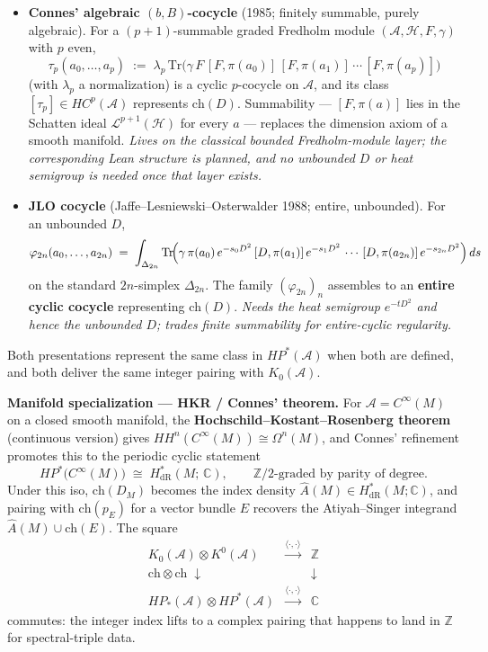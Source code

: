 \documentclass[
  11pt,
]{article}
\providecommand{\tightlist}{%
  \setlength{\itemsep}{0pt}\setlength{\parskip}{0pt}}
\begin{document}
\begin{itemize}
\tightlist
\item
  \textbf{Connes' algebraic \((b, B)\)-cocycle} (1985; finitely
  summable, purely algebraic). For a \((p+1)\)-summable graded Fredholm
  module \((\mathcal{A}, \mathcal{H}, F, \gamma)\) with \(p\) even, \[
  \tau_p(a_0, \dots, a_p)
  \;:=\; \lambda_p\,\mathrm{Tr}\bigl(\gamma\,F\,[F, \pi(a_0)]\,[F, \pi(a_1)]\,\cdots\,[F, \pi(a_p)]\bigr)
  \] (with \(\lambda_p\) a normalization) is a cyclic \(p\)-cocycle on
  \(\mathcal{A}\), and its class \([\tau_p] \in HC^p(\mathcal{A})\)
  represents \(\mathrm{ch}(D)\). Summability --- \([F, \pi(a)]\) lies in
  the Schatten ideal \(\mathcal{L}^{p+1}(\mathcal{H})\) for every \(a\)
  --- replaces the dimension axiom of a smooth manifold. \emph{Lives
  on the classical bounded Fredholm-module layer; the corresponding
  Lean structure is planned, and no unbounded \(D\) or heat semigroup
  is needed once that layer exists.}
\item
  \textbf{JLO cocycle} (Jaffe--Lesniewski--Osterwalder 1988; entire,
  unbounded). For an unbounded \(D\), \[
  \varphi_{2n}(a_0, \dots, a_{2n}) \;=\;
  \int_{\Delta_{2n}} \mathrm{Tr}\!\Bigl(\gamma\,\pi(a_0)\,e^{-s_0 D^2}\,[D, \pi(a_1)]\,e^{-s_1 D^2}\,\cdots\,[D, \pi(a_{2n})]\,e^{-s_{2n} D^2}\Bigr)\,ds
  \] on the standard \(2n\)-simplex \(\Delta_{2n}\). The family
  \((\varphi_{2n})_n\) assembles to an \textbf{entire cyclic cocycle}
  representing \(\mathrm{ch}(D)\). \emph{Needs the heat semigroup
  \(e^{-tD^2}\) and hence the unbounded \(D\); trades finite summability
  for entire-cyclic regularity.}
\end{itemize}

Both presentations represent the same class in \(HP^*(\mathcal{A})\)
when both are defined, and both deliver the same integer pairing with
\(K_0(\mathcal{A})\).

\textbf{Manifold specialization --- HKR / Connes' theorem.} For
\(\mathcal{A}= C^\infty(M)\) on a closed smooth manifold, the
\textbf{Hochschild--Kostant--Rosenberg theorem} (continuous version)
gives \(HH^n(C^\infty(M)) \cong \Omega^n(M)\), and Connes' refinement
promotes this to the periodic cyclic statement \[
HP^*\bigl(C^\infty(M)\bigr) \;\cong\; H^*_{\mathrm{dR}}(M;\, \mathbb{C}),
\qquad \text{$\mathbb{Z}/2$-graded by parity of degree.}
\] Under this iso, \(\mathrm{ch}(D_M)\) becomes the index density
\(\widehat{A}(M) \in H^*_{\mathrm{dR}}(M;\mathbb{C})\), and pairing with
\(\mathrm{ch}(p_E)\) for a vector bundle \(E\) recovers the
Atiyah--Singer integrand \(\widehat{A}(M) \cup \mathrm{ch}(E)\). The
square \[
\begin{array}{ccc}
K_0(\mathcal{A}) \otimes K^0(\mathcal{A}) & \xrightarrow{\langle\cdot,\cdot\rangle} & \mathbb{Z}\\
\mathrm{ch}\otimes\mathrm{ch}\;\downarrow & & \downarrow \\
HP_*(\mathcal{A}) \otimes HP^*(\mathcal{A}) & \xrightarrow{\langle\cdot,\cdot\rangle} & \mathbb{C}
\end{array}
\] commutes: the integer index lifts to a complex pairing that happens
to land in \(\mathbb{Z}\) for spectral-triple data.
\end{document}
